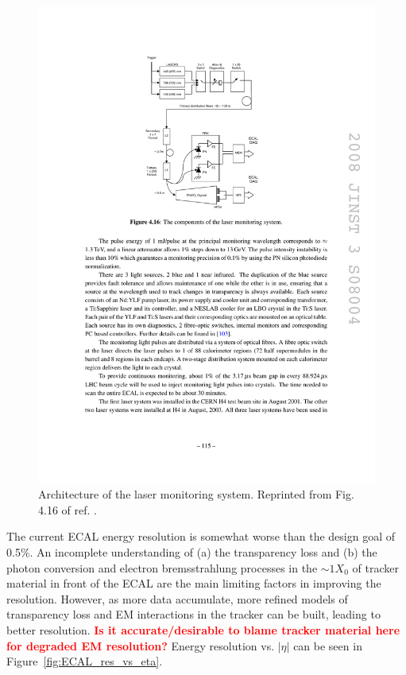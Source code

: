 \documentclass[dissertation.tex]{subfiles}
\begin{document}
\begin{figure}
	\centering
	\includegraphics[scale=1.0]{ECAL_laser_system}
	\caption{Architecture of the laser monitoring system.  Reprinted from Fig. 4.16 of ref. \cite{CMS_detector_paper}.}
	\label{fig:ECAL_laser_system}
\end{figure}

The current ECAL energy resolution is somewhat worse than the design goal of 0.5\%.  An incomplete understanding of (a) the transparency loss and (b) the photon conversion and electron bremsstrahlung processes in the $\sim1X_{0}$ of tracker material in front of the ECAL are the main limiting factors in improving the resolution.  However, as more data accumulate, more refined models of transparency loss and EM interactions in the tracker can be built, leading to better resolution.  \textcolor{red}{\textbf{Is it accurate/desirable to blame tracker material here for degraded EM resolution?}}  Energy resolution vs. $|\eta|$ can be seen in Figure~\ref{fig:ECAL_res_vs_eta}.
\end{document}
